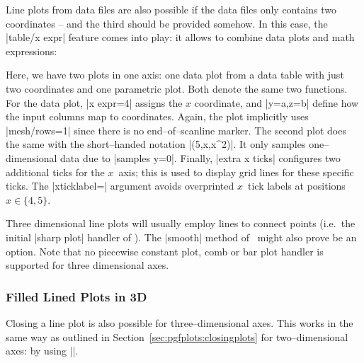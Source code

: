 {Line plots from data files are also possible if the data files only contains two coordinates -- and the third should be provided somehow. In this case, the |table/x expr| feature comes into play: it allows to combine data plots and math expressions:
\begin{codeexample}[]
\end{codeexample}
\noindent Here, we have two plots in one axis: one data plot from a data table with just two coordinates and one parametric plot. Both denote the same two functions. For the data plot, |x expr=4| assigns the $x$ coordinate, and |y=a,z=b| define how the input columns map to coordinates. Again, the plot implicitly uses |mesh/rows=1| since there is no end--of--scanline marker. The second plot does the same with the short--handed notation |(5,x,x^2)|. It only samples one--dimensional data due to |samples y=0|. Finally, |extra x ticks| configures two additional ticks for the $x$~axis; this is used to display grid lines for these specific ticks. The |xticklabel=\empty| argument avoids overprinted $x$~tick labels at positions $x\in\{4,5\}$.


Three dimensional line plots will usually employ lines to connect points (i.e.\ the initial |sharp plot| handler of \Tikz). The |smooth| method of \Tikz\ might also prove be an option. Note that no piecewise constant plot, comb or bar plot handler is supported for three dimensional axes.

\subsubsection{Filled Lined Plots in 3D}
\label{sec:pgfplots:filled:line}
Closing a line plot is also possible for three--dimensional axes. This works in the same way as outlined in Section~\ref{sec:pgfplots:closingplots} for two--dimensional axes: by using |\closedcycle|.

}
